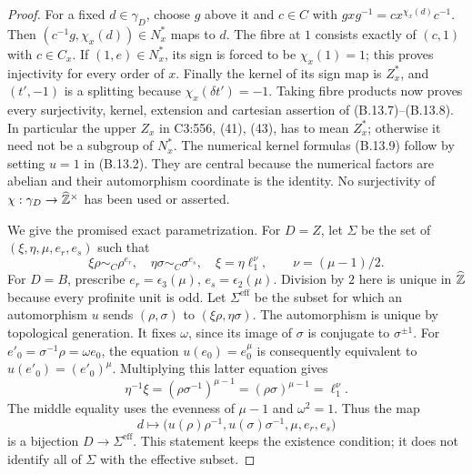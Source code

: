 \begin{proof}
For a fixed $d\in\gamma_D$, choose $g$ above it and $c\in C$ with
$gxg^{-1}=cx^{\chi_x(d)}c^{-1}$. Then
$(c^{-1}g,\chi_x(d))\in N_x^*$ maps to $d$.
The fibre at $1$ consists exactly of $(c,1)$ with $c\in C_x$.
If $(1,e)\in N_x^*$, its sign is forced to be $\chi_x(1)=1$;
this proves injectivity for every order of $x$. Finally the kernel
of its sign map is $Z_x^*$, and $(t',-1)$ is a splitting because
$\chi_x(\delta t')=-1$. Taking fibre products now proves every
surjectivity, kernel, extension and cartesian assertion of
(B.13.7)--(B.13.8). In particular the upper $Z_x$ in C3:556,
(41), (43), has to mean $Z_x^*$; otherwise it need not be a
subgroup of $N_x^*$. The numerical kernel formulas (B.13.9) follow
by setting $u=1$ in (B.13.2). They are central because the numerical
factors are abelian and their automorphism coordinate is the identity.
No surjectivity of $\chi:\gamma_D\to\widehat{\mathbb Z}^\times$ has been
used or asserted.

We give the promised exact parametrization. For $D=Z$, let $\Sigma$
be the set of $(\xi,\eta,\mu,e_r,e_s)$ such that
\[
 \xi\rho\sim_C\rho^{e_r},\quad
 \eta\sigma\sim_C\sigma^{e_s},\quad
 \xi=\eta\ell_1^{\nu},\qquad \nu=(\mu-1)/2.
                                                        \tag{B.13.10}
\]
For $D=B$, prescribe $e_r=\epsilon_3(\mu)$,
$e_s=\epsilon_2(\mu)$. Division by $2$ here is unique in
$\widehat{\mathbb Z}$ because every profinite unit is odd.
Let $\Sigma^{\mathrm{eff}}$ be the subset for which an automorphism
$u$ sends $(\rho,\sigma)$ to $(\xi\rho,\eta\sigma)$.
The automorphism is unique by topological generation. It fixes
$\omega$, since its image of $\sigma$ is conjugate to
$\sigma^{\pm1}$. For $e'_0=\sigma^{-1}\rho=\omega e_0$, the
equation $u(e_0)=e_0^\mu$ is consequently equivalent to
$u(e'_0)=(e'_0)^\mu$. Multiplying this latter equation gives
\[
 \eta^{-1}\xi=(\rho\sigma^{-1})^{\mu-1}
             =(\rho\sigma)^{\mu-1}=\ell_1^\nu.
\]
The middle equality uses the evenness of $\mu-1$ and $\omega^2=1$.
Thus the map
\[
 d\longmapsto\bigl(u(\rho)\rho^{-1},u(\sigma)\sigma^{-1},
 \mu,e_r,e_s\bigr)
\]
is a bijection $D\to\Sigma^{\mathrm{eff}}$.
This statement keeps the existence condition; it does not identify
all of $\Sigma$ with the effective subset.


\end{proof}
